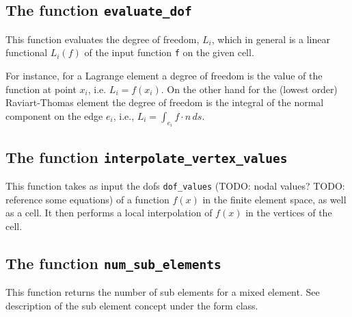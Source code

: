 
\subsection{The function \texttt{evaluate\_dof}}
This function evaluates the degree of freedom, $L_i$,  
which in general is a linear functional 
$L_i(f)$ of the input function \texttt{f}
on the given cell. 
  
For instance, for a Lagrange element a degree of
freedom is the value of the function at point $x_i$, i.e. $L_i = f(x_i)$. 
On the other hand for the (lowest order) Raviart-Thomas element 
the degree of freedom is the integral of the normal component
on the edge $e_i$, i.e., $L_i = \int_{e_i} f\cdot n \, ds$.  


\subsection{The function \texttt{interpolate\_vertex\_values}}
This function takes as input the dofs \texttt{dof\_values} (TODO: nodal values? TODO: reference some equations)
of a function $f(x)$ in the finite element space, as well as a cell.
It then performs a local interpolation of $f(x)$ in the vertices of the cell.


\subsection{The function \texttt{num\_sub\_elements}}
This function returns the number of sub elements for a mixed element.
See description of the sub element concept under the form class.


